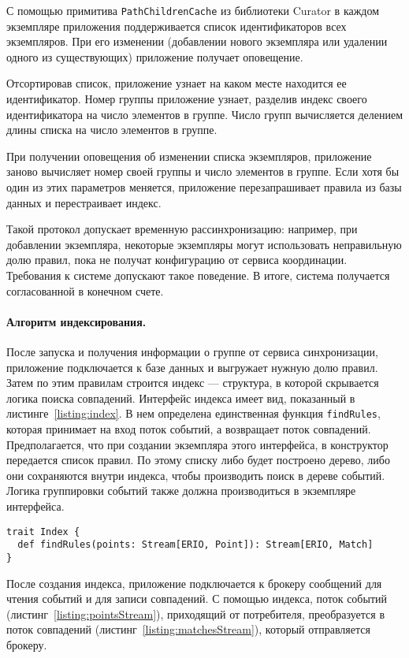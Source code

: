 \documentclass[14pt]{article}
\begin{document}
С помощью примитива \verb|PathChildrenCache| из библиотеки Curator в каждом экземпляре приложения поддерживается список идентификаторов всех экземпляров. При его изменении (добавлении нового экземпляра или удалении одного из существующих) приложение получает оповещение.

Отсортировав список, приложение узнает на каком месте находится ее идентификатор. Номер группы приложение узнает, разделив индекс своего идентификатора на число элементов в группе. Число групп вычисляется делением длины списка на число элементов в группе.

При получении оповещения об изменении списка экземпляров, приложение заново вычисляет номер своей группы и число элементов в группе. Если хотя бы один из этих параметров меняется, приложение перезапрашивает правила из базы данных и перестраивает индекс.

Такой протокол допускает временную рассинхронизацию: например, при добавлении экземпляра, некоторые экземпляры могут использовать неправильную долю правил, пока не получат конфигурацию от сервиса координации. Требования к системе допускают такое поведение. В итоге, система получается согласованной в конечном счете.

\paragraph{Алгоритм индексирования.} После запуска и получения информации о группе от сервиса синхронизации, приложение подключается к базе данных и выгружает нужную долю правил. Затем по этим правилам строится индекс --- структура, в которой скрывается логика поиска совпадений. Интерфейс индекса имеет вид, показанный в листинге~\ref{listing:index}. В нем определена единственная функция \verb|findRules|, которая принимает на вход поток событий, а возвращает поток совпадений. Предполагается, что при создании экземпляра этого интерфейса, в конструктор передается список правил. По этому списку либо будет построено дерево, либо они сохраняются внутри индекса, чтобы производить поиск в дереве событий. Логика группировки событий также должна производиться в экземпляре интерфейса.

\begin{lstlisting}[style=scalaStyle,caption={Интерфейс, описывающий индекс.},label={listing:index},captionpos=b, float]
trait Index {
  def findRules(points: Stream[ERIO, Point]): Stream[ERIO, Match]
}
\end{lstlisting}

После создания индекса, приложение подключается к брокеру сообщений для чтения событий и для записи совпадений. С помощью индекса, поток событий (листинг~\ref{listing:pointsStream}), приходящий от потребителя, преобразуется в поток совпадений (листинг~\ref{listing:matchesStream}), который отправляется брокеру.
\end{document}
